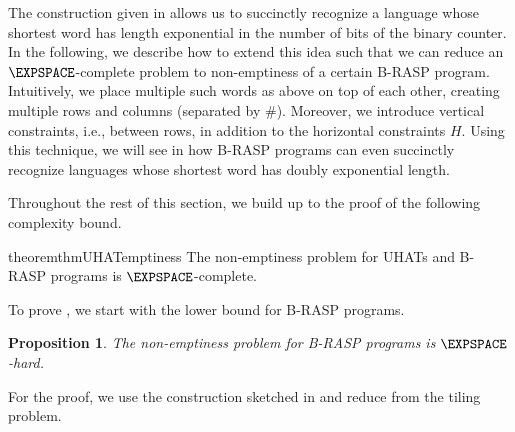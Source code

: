 \documentclass{article} %
\newtheorem{proposition}[theorem]{Proposition}
\newcommand{\sym}[1]{\mathrm{#1}}
\begin{document}
The construction given in  allows us to succinctly recognize a language whose shortest word has length exponential
in the number of bits of the binary counter.
In the following, we describe how to extend this idea such that we can reduce an $\EXPSPACE$-complete problem to non-emptiness of a certain B-RASP program.
Intuitively, we place multiple such words as above on top of each other, creating multiple rows and columns (separated by $\sym{\#}$).
Moreover, we introduce vertical constraints, i.e., between rows, in addition to the horizontal constraints $H$.
Using this technique, we will see in  how B-RASP programs
can even succinctly recognize languages whose shortest word has doubly exponential length.

Throughout the rest of this section, we build up to the proof of the following complexity bound.
\begin{restatable}[]{theorem}{thmUHATemptiness}\label{thm:UHAT-emptiness}
The non-emptiness problem for UHATs and B-RASP programs is $\EXPSPACE$-complete.
\end{restatable}

To prove , we start with the lower bound for B-RASP programs.
\begin{proposition}\label{prop:hardness}
The non-emptiness problem for B-RASP programs is $\EXPSPACE$-hard.
\end{proposition}
For the proof, we use the construction sketched in  and reduce from the tiling problem.
\end{document}
